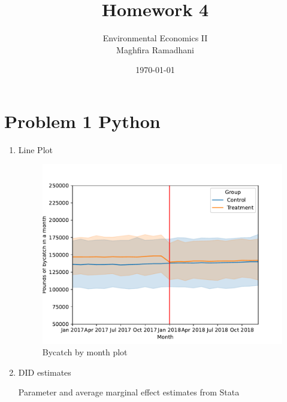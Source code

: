 \documentclass{article}
\begin{document}
 
\title{Homework 4}
\author{Environmental Economics II\\
Maghfira Ramadhani}
\date{\today}
\maketitle

\section*{Problem 1 Python}
\begin{enumerate}
\item Line Plot
        \begin{figure}[H]
        \centering
        \includegraphics[scale = 0.7]{./figure/paralleltrend.pdf}
        \caption{Bycatch by month plot}
        \label{f1:paralleltrend}
        \end{figure}

\item DID estimates


\begin{table}[H]\centering
\begin{threeparttable}
\caption{Parameter and average marginal effect estimates from Stata}
\label{t1:didstimates}

\end{threeparttable}
\end{table}


\end{enumerate}
\end{document}
